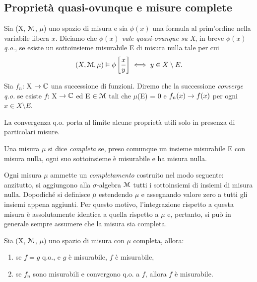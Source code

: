 \documentclass[Completo.tex]{subfiles}
\begin{document}
	\subsection{Proprietà quasi-ovunque e misure complete}
	Sia (X, $\eu[M]$, $\mu$) uno spazio di misura e sia $\phi(x)$ una formula al prim'ordine nella variabile libera $x$. Diciamo che \textit{$\phi(x)$ vale quasi-ovunque su X}, in breve \textit{$\phi(x)$ q.o.}, se esiste un sottoinsieme misurabile E di misura nulla tale per cui
	\begin{equation*}
	(X, \eu[M], \mu) \vDash \phi \left[\frac{x}{y}\right] \iff y \in X\setminus E.
	\end{equation*}
	\begin{Def}
		Sia $f_n$: X $\ra \bb[C]$ una successione di funzioni. Diremo che la successione \textit{converge q.o.} se esiste $f$: X $\ra \bb[C]$ ed E $\in \eu[M]$ tali che $\mu$(E) = 0 e $f_n(x) \rightarrow f(x)$ per ogni $x \in X\setminus E$.
	\end{Def}
	La convergenza q.o. porta al limite alcune proprietà utili solo in presenza di particolari misure.
	\begin{Def}
		Una misura $\mu$ si dice \textit{completa} se, preso comunque un insieme misurabile E con misura nulla, ogni suo sottoinsieme è misurabile e ha misura nulla.
	\end{Def}
	\begin{Rem}
		Ogni misura $\mu$ ammette un \textit{completamento} costruito nel modo seguente: anzitutto, si aggiungono alla $\sigma$-algebra $\eu[M]$ tutti i sottoinsiemi di insiemi di misura nulla. Dopodiché si definisce $\overline{\mu}$ estendendo $\mu$ e assegnando valore zero a tutti gli insiemi appena aggiunti. Per questo motivo, l'integrazione rispetto a questa misura è assolutamente identica a quella rispetto a $\mu$ e, pertanto, si può in generale sempre assumere che la misura sia completa.
	\end{Rem}
	\begin{Prop}
		Sia (X, $\eu[M]$, $\mu$)  uno spazio di misura con $\mu$ completa, allora:
		\begin{enumerate}
			\item se $f = g$ q.o., e $g$ è misurabile, $f$ è misurabile,
			\item se $f_n$ sono misurabili e convergono q.o. a $f$, allora $f$ è misurabile.
		\end{enumerate}
	\end{Prop}
\end{document}
